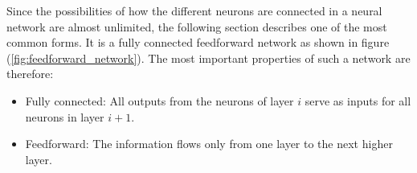 Since the possibilities of how the different neurons are connected in a neural network are almost unlimited, the following section describes one of the most common forms. It is a fully connected feedforward network as shown in figure (\ref{fig:feedforward_network}). The most important properties of such a network are therefore:

\begin{itemize}
	\item Fully connected: All outputs from the neurons of layer $i$ serve as inputs for all neurons in layer $i+1$.
	\item Feedforward: The information flows only from one layer to the next higher layer. 
\end{itemize}

 \cite{Mar_Pri}
